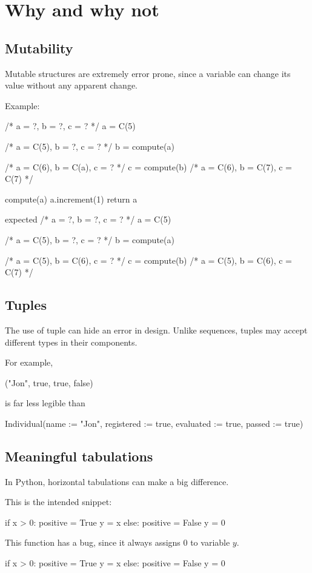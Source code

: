 \section{Why and why not}

\subsection{Mutability}
Mutable structures are extremely error prone, since a variable can change its value without any apparent change.

Example:

/* a = ?, b = ?, c = ? */
a = C(5)

/* a = C(5), b = ?, c = ? */
b = compute(a)

/* a = C(6), b = C(a), c = ? */
c = compute(b)
/* a = C(6), b = C(7), c = C(7) */


compute(a)
a.increment(1)
return a


expected
/* a = ?, b = ?, c = ? */
a = C(5)

/* a = C(5), b = ?, c = ? */
b = compute(a)

/* a = C(5), b = C(6), c = ? */
c = compute(b)
/* a = C(5), b = C(6), c = C(7) */

\subsection{Tuples}

The use of tuple can hide an error in design.
Unlike sequences, tuples may accept different types in their components.

For example,

("Jon", true, true, false)

is far less legible than

Individual(name := "Jon", registered := true, evaluated := true, passed := true)

\subsection{Meaningful tabulations}

In Python, horizontal tabulations can make a big difference.

This is the intended snippet:

if x > 0:
positive = True
y = x
else:
positive = False
y = 0


This function has a bug, since it always assigns 0 to variable $y$.

if x > 0:
positive = True
y = x
else:
positive = False
y = 0

